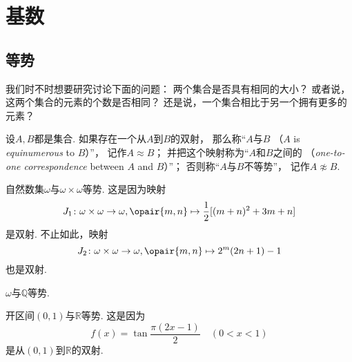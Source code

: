 \section{基数}
\subsection{等势}
我们时不时想要研究讨论下面的问题：
两个集合是否具有相同的大小？
或者说，这两个集合的元素的个数是否相同？
还是说，一个集合相比于另一个拥有更多的元素？

\begin{definition}\label{definition:基数.等势的定义}
设\(A,B\)都是集合.
如果存在一个从\(A\)到\(B\)的双射，
那么称“\(A\)与\(B\) （\(A\) is \emph{equinumerous} to \(B\)）”，
记作\(A \approx B\)；
并把这个映射称为“\(A\)和\(B\)之间的%
（\emph{one-to-one correspondence} between \(A\) and \(B\)）”；
否则称“\(A\)与\(B\)不等势”，
记作\(A \napprox B\).
\end{definition}

\begin{example}
自然数集\(\omega\)与\(\omega\times\omega\)等势.
这是因为映射\begin{equation*}
	J_1\colon \omega\times\omega\to\omega,
	\opair{m,n} \mapsto \frac12[(m+n)^2+3m+n]
\end{equation*}是双射.
不止如此，映射\begin{equation*}
	J_2\colon \omega\times\omega\to\omega,
	\opair{m,n} \mapsto 2^m(2n+1)-1
\end{equation*}也是双射.
\end{example}

\begin{example}
\(\omega\)与\(\mathbb{Q}\)等势.
\end{example}

\begin{example}\label{example:基数.开区间与全体实数等势1}
开区间\((0,1)\)与\(\mathbb{R}\)等势.
这是因为\begin{equation*}
	f(x) = \tan\frac{\pi(2x-1)}2
	\quad(0<x<1)
\end{equation*}是从\((0,1)\)到\(\mathbb{R}\)的双射.
\end{example}

